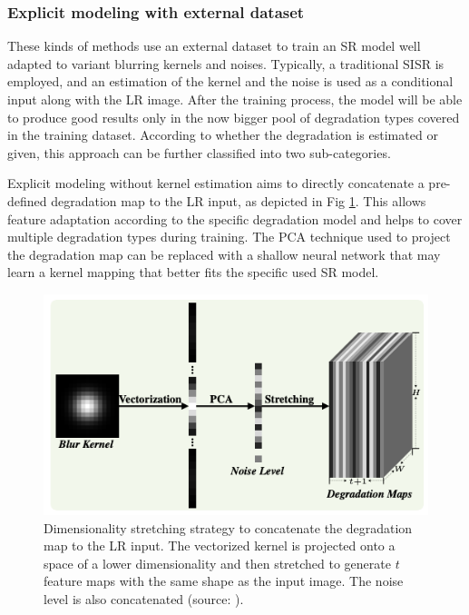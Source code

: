         \subsubsection{Explicit modeling with external dataset}

        These kinds of methods use an external dataset to train an SR model well adapted to variant blurring kernels and noises. 
        Typically, a traditional SISR is employed, and an estimation of the kernel and the noise is used as a conditional input along with the LR image.
        After the training process, the model will be able to produce good results only in the now bigger pool of degradation types covered in the training dataset.
        According to whether the degradation is estimated or given, this approach can be further classified into two sub-categories.


        Explicit modeling without kernel estimation aims to directly concatenate a pre-defined degradation map to the LR input, as depicted in Fig \ref{fig:2-external-dataset-stretching}. 
        This allows feature adaptation according to the specific degradation model and helps to cover multiple degradation types during training. 
        The PCA technique used to project the degradation map can be replaced with a shallow neural network that may learn a kernel mapping that better fits the specific used SR model.

        \begin{figure}[H]
            \centering
            \includegraphics[width=\textwidth]{Includes/2-external-dataset-stretching.png}
            \caption{Dimensionality stretching strategy to concatenate the degradation map to the LR input. 
                     The vectorized kernel is projected onto a space of a lower dimensionality and then stretched to generate $t$ feature maps with the same shape as the input image.
                     The noise level is also concatenated (source: \cite{zhang2018residual}).}    
            \label{fig:2-external-dataset-stretching}
        \end{figure}

